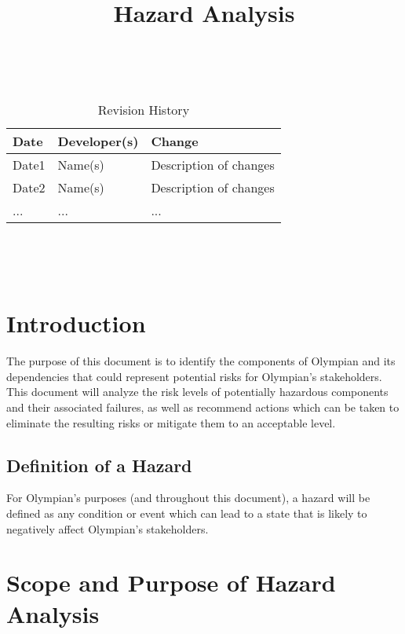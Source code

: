 \documentclass{article}
\title{Hazard Analysis\\\progname}
\author{\authname}
\date{}
\begin{document}
	
	\maketitle
	\thispagestyle{empty}
	
	~\newpage
	
	
	\begin{table}[hp]
		\caption{Revision History} \label{TblRevisionHistory}
		\begin{tabularx}{\textwidth}{llX}
			\toprule
			\textbf{Date} & \textbf{Developer(s)} & \textbf{Change}\\
			\midrule
			Date1 & Name(s) & Description of changes\\
			Date2 & Name(s) & Description of changes\\
			... & ... & ...\\
			\bottomrule
		\end{tabularx}
	\end{table}
	
	~\newpage
	
	\tableofcontents
	
	~\newpage
	
	
	\section{Introduction}
	
	The purpose of this document is to identify the components of Olympian and its dependencies that could represent potential risks for Olympian's stakeholders. This document will analyze the risk levels of potentially hazardous components and their associated failures, as well as recommend actions which can be taken to eliminate the resulting risks or mitigate them to an acceptable level.
	
	\subsection{Definition of a Hazard}
	For Olympian's purposes (and throughout this document), a hazard will be defined as any condition or event which can lead to a state that is likely to negatively affect Olympian's stakeholders.
	
	\section{Scope and Purpose of Hazard Analysis}
	
\end{document}
